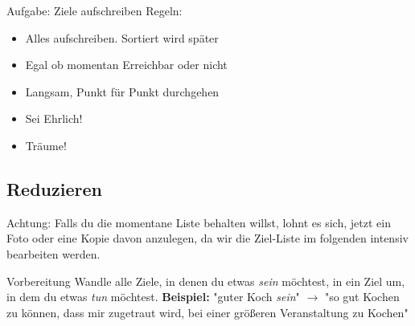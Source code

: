 \begin{frame}[c]
    \begin{block}{Aufgabe: Ziele aufschreiben}
    Regeln:
    \begin{itemize}
        \item Alles aufschreiben. Sortiert wird später
        \item Egal ob momentan Erreichbar oder nicht
        \item Langsam, Punkt für Punkt durchgehen
        \item Sei Ehrlich!
        \item Träume!
    \end{itemize}
    \end{block}
\end{frame}



\subsection{Reduzieren}

\addtocounter{framenumber}{1}
\begin{frame}[standout]
    \LARGE
    Achtung: Falls du die momentane Liste behalten willst, lohnt es sich, jetzt
    ein Foto oder eine Kopie davon anzulegen, da wir die Ziel-Liste im
    folgenden intensiv bearbeiten werden.
\end{frame}

\begin{frame}[c]{Vorbereitung}
    \Large
    Wandle alle Ziele, in denen du etwas {\em sein} möchtest, in ein Ziel um,
    in dem du etwas {\em tun} möchtest. \newline \newline \pause
    \textbf{Beispiel:} "guter Koch {\em sein}" $\rightarrow$ "so gut Kochen zu
    können, dass mir zugetraut wird, bei einer größeren Veranstaltung zu Kochen"
\end{frame}

